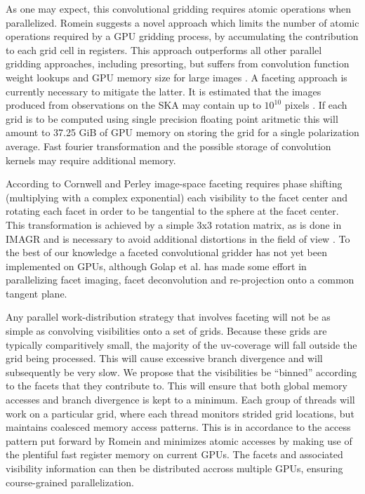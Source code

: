 \documentclass[a4paper, two column]{article}
\begin{document}
 As one may expect, this convolutional gridding requires atomic operations when parallelized. Romein \cite{romein2012efficient} suggests a novel approach which limits the number of atomic operations required by a GPU gridding process, by accumulating
 the contribution to each grid cell in registers. This approach outperforms all other parallel gridding approaches, including presorting, but suffers from convolution function weight lookups and GPU memory size for large images \cite{muscat2014high}.
 A faceting approach is currently necessary to mitigate the latter. It is estimated that the images produced from observations on the SKA may contain up to $10^{10}$ pixels \cite{cornwell2012wide}. If each grid is to be computed using single precision floating point
 aritmetic this will amount to 37.25 GiB of GPU memory on storing the grid for a single polarization average. Fast fourier transformation and the possible storage of convolution kernels may require additional memory. 
 
 According to Cornwell and Perley \cite{cornwell1992radio} image-space faceting requires phase shifting (multiplying with a complex exponential) each visibility to the facet center and rotating each facet in order to 
 be tangential to the sphere at the facet center. This transformation is achieved by a simple 3x3 rotation matrix, as is done in IMAGR \cite{AIPS113} and is necessary to avoid additional distortions in the field of view \cite[pg. 395]{taylor1999synthesis}. To the best of our knowledge 
 a faceted convolutional gridder has not yet been implemented on GPUs, although Golap et al. \cite{golap2001parallelization} has made some effort in parallelizing facet imaging, facet deconvolution and re-projection onto a common tangent plane.
 
 Any parallel work-distribution strategy that involves faceting will not be as simple as convolving visibilities onto a set of grids. Because these grids are typically comparitively small, the majority of the uv-coverage will fall outside the grid being processed. This will cause 
 excessive branch divergence and will subsequently be very slow. We propose that the visibilities be ``binned'' according to the facets that they contribute to. This will ensure that both global memory accesses and branch divergence is kept to a minimum. Each group of threads will
 work on a particular grid, where each thread monitors strided grid locations, but maintains coalesced memory access patterns. This is in accordance to the access pattern put forward by Romein \cite{romein2012efficient} and minimizes atomic accesses by making use of the plentiful fast 
 register memory on current GPUs. The facets and associated visibility information can then be distributed accross multiple GPUs, ensuring course-grained parallelization.
\end{document}
